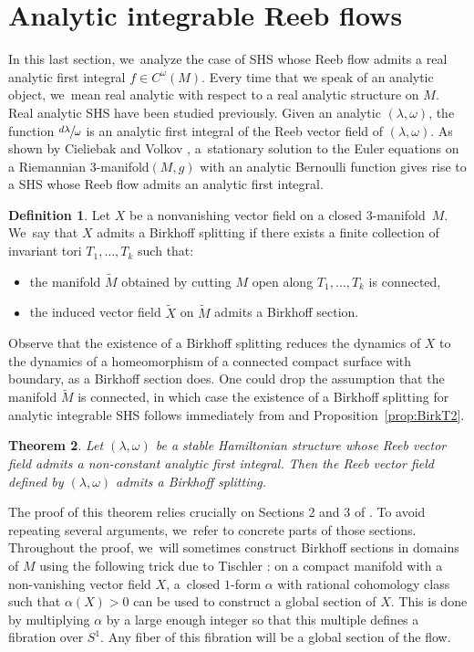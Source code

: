 \documentclass[JEP,XML,SOM,Unicode,NoEqCountersInSection,NoFloatCountersInSection,published]{cedram}
\newcommand{\threemanifold}{$3$\nobreakdash-mani\-fold\xspace}
\newtheorem{theorem}{Theorem}[section]
\theoremstyle{definition}
\newtheorem{defi}[theorem]{Definition}
\begin{document}
\section{Analytic integrable Reeb flows}\label{sec:analytic}

In this last section, we~analyze the case of SHS whose Reeb flow admits a real analytic first integral $f\in C^\omega (M)$. Every time that we speak of an analytic object, we~mean real analytic with respect to a real analytic structure on $M$. Real analytic SHS have been studied previously. Given an analytic $(\lambda,\omega)$, the function $\sfrac{d\lambda}{\omega}$ is an analytic first integral of the Reeb vector field of $(\lambda,\omega)$. As shown by
Cieliebak and Volkov \cite{CV2}, a~stationary solution to the Euler equations on a Riemannian \threemanifold $(M,g)$ with an analytic Bernoulli function gives rise to a SHS whose Reeb flow admits an analytic first integral.

\begin{defi}\label{def:Bsplit}
Let $X$ be a nonvanishing vector field on a closed \threemanifold~$M$. We~say that $X$ admits a Birkhoff splitting if there exists a finite collection of invariant tori $T_1,\dots,T_k$ such that:
\begin{itemize}
\item
the manifold $\widetilde M$ obtained by cutting $M$ open along $T_1,\dots,T_k$ is connected,
\item
the induced vector field $\widetilde X$ on $\widetilde M$ admits a Birkhoff section.
\end{itemize}
\end{defi}
Observe that the existence of a Birkhoff splitting reduces the dynamics of $X$ to the dynamics of a homeomorphism of a connected compact surface with boundary, as a Birkhoff section does. One could drop the assumption that the manifold $\widetilde M$ is connected, in which case the existence of a Birkhoff splitting for analytic integrable SHS follows immediately from \cite{CV2} and Proposition~\ref{prop:BirkT2}.

\begin{theorem}\label{thm:split}
Let $(\lambda,\omega)$ be a stable Hamiltonian structure whose Reeb vector field admits a non-constant analytic first integral. Then the Reeb vector field defined by $(\lambda,\omega)$ admits a Birkhoff splitting.
\end{theorem}

The proof of this theorem relies crucially on Sections 2 and 3 of \cite{CV2}. To avoid repeating several arguments, we~refer to concrete parts of those sections. Throughout the proof, we~will sometimes construct Birkhoff sections in domains of $M$ using the following trick due to Tischler \cite{Tis}: on a compact manifold with a non-vanishing vector field $X$, a~closed $1$-form $\alpha$ with rational cohomology class such that $\alpha(X)>0$ can be used to construct a global section of $X$. This is done by multiplying $\alpha$ by a large enough integer so that this multiple defines a fibration over $S^1$. Any fiber of this fibration will be a global section of the flow.
\end{document}
